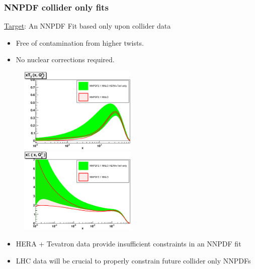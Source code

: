 \documentclass[10pt]{beamer}
\begin{document}
\begin{frame}
\frametitle{ NNPDF collider only fits }

\underline{Target}: An NNPDF Fit based only upon collider data
\begin{itemize}
\item<1-> Free of contamination from higher twists.
\item<1-> No nuclear corrections required.
\end{itemize}

 \begin{figure}[b!]
    \begin{center}
      \includegraphics[width=0.50\textwidth]{xT3_Q_2_log-nnpdf21nnlo-collider.eps}
      \includegraphics[width=0.50\textwidth]{xSinglet_Q_2_log-nnpdf21nnlo-collider.eps}
    \end{center}
    \vskip-0.5cm
    \label{fig:pdf-jets}
\end{figure}
\begin{itemize}
\item<1->HERA + Tevatron data provide insufficient constraints in an NNPDF fit
\end{itemize}

\begin{itemize}
\item<1-> LHC data will be crucial to properly constrain future collider only NNPDFs
\end{itemize}
\end{frame}
\end{document}
